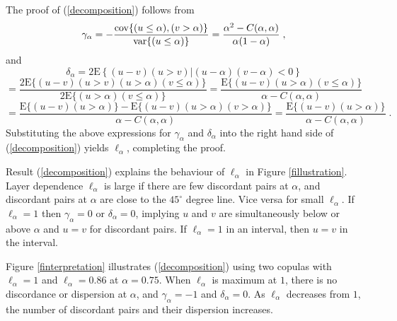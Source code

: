 \documentclass[authoryear]{elsarticle}
\newcommand{\var}{{\rm var}}
\newcommand{\cov}{{\rm cov}}
\newcommand{\E}{{\mathrm E}}
\newcommand{\eref}[1]{(\ref{#1})}
\newcommand{\fref}[1]{Figure \ref{#1}}
\begin{document}
The proof of \eref{decomposition} follows from
$$
\gamma_\alpha
=-\frac{\cov\{(u\leq\alpha),(v>\alpha)\}}{\var\{(u\leq\alpha)\}}
=\frac{\alpha^2-C(\alpha,\alpha)}{\alpha(1-\alpha)}   \;,
$$
and
$$
\delta_\alpha = 2 \E\left\{(u-v)(u>v)|(u-\alpha)(v-\alpha)<0\right\}
$$
$$
=  \frac{2\E\{(u-v)(u>v)(u>\alpha)(v\leq\alpha)\}}{2\E\{(u>\alpha)(v\leq\alpha)\}}
= \frac{\E\{(u-v)(u>\alpha)(v\leq\alpha)\}}{\alpha-C(\alpha,\alpha)}
$$
$$
= \frac{\E\{(u-v)(u>\alpha)\}-\E\{(u-v)(u>\alpha)(v>\alpha)\}}{\alpha-C(\alpha,\alpha)}
 = \frac{\E\{(u-v)(u>\alpha)\}}{\alpha-C(\alpha,\alpha)} \;.
$$
Substituting the above expressions for $\gamma_\alpha$ and $\delta_\alpha$ into the right hand side of \eref{decomposition} yields $\ell_\alpha$, completing the proof.

Result \eref{decomposition} explains the behaviour of $\ell_\alpha$ in \fref{fillustration}. Layer dependence $\ell_\alpha$ is large if there are few discordant pairs at $\alpha$, and  discordant pairs at $\alpha$ are close to the $45^\circ$ degree line. Vice versa for small $\ell_\alpha$. If $\ell_\alpha=1$ then $\gamma_\alpha=0$ or $\delta_\alpha=0$, implying $u$ and $v$ are simultaneously below or above $\alpha$ and $u=v$ for discordant pairs. If $\ell_\alpha=1$  in an interval, then $u=v$  in the interval.

\fref{finterpretation} illustrates \eref{decomposition} using two copulas with $\ell_\alpha=1$ and $\ell_\alpha=0.86$ at $\alpha=0.75$. When $\ell_\alpha$ is maximum at $1$, there is no discordance or dispersion at $\alpha$, and $\gamma_\alpha=-1$ and $\delta_\alpha=0$. As $\ell_\alpha$ decreases from $1$, the number of discordant pairs and their dispersion increases.
\end{document}
